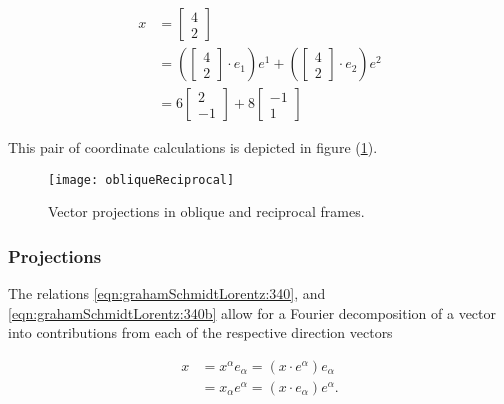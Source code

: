 \begin{equation}\label{eqn:grahamSchmidtLorentz:290}
\begin{aligned}
x
&=
\begin{bmatrix}
4 \\
2
\end{bmatrix} \\
&=
\left(
\begin{bmatrix}
4 \\
2
\end{bmatrix}
\cdot e_1
\right)
e^1
+
\left(
\begin{bmatrix}
4 \\
2
\end{bmatrix}
\cdot e_2
\right)
e^2 \\
&= 6
\begin{bmatrix}
2 \\
-1
\end{bmatrix}
+
8
\begin{bmatrix}
-1 \\
1
\end{bmatrix}
\end{aligned}
\end{equation}

This pair of coordinate calculations is depicted in figure (\ref{fig:obliqueReciprocal}).

\begin{figure}[htp]
\centering
\texttt{[image: obliqueReciprocal]}
\caption{Vector projections in oblique and reciprocal frames.}\label{fig:obliqueReciprocal}
\end{figure}

\subsubsection{Projections}

The relations \ref{eqn:grahamSchmidtLorentz:340}, and \ref{eqn:grahamSchmidtLorentz:340b} allow for a Fourier decomposition of a vector into contributions from each of the respective direction vectors

\begin{equation}\label{eqn:grahamSchmidtLorentz:330}
\begin{aligned}
x &= x^\alpha e_\alpha = (x \cdot e^\alpha) e_\alpha \\
  &= x_\alpha e^\alpha = (x \cdot e_\alpha) e^\alpha.
\end{aligned}
\end{equation}

